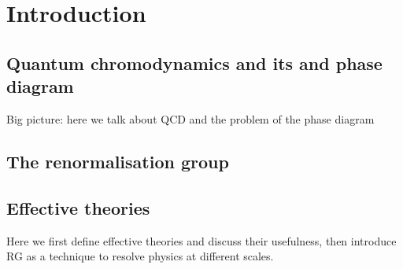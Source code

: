 \chapter{Introduction}
\section{Quantum chromodynamics and its and phase diagram}
Big picture: here we talk about QCD and the problem of the phase diagram
\section{The renormalisation group}
\section{Effective theories}
Here we first define effective theories and discuss their usefulness, then introduce RG as a technique to resolve physics at different scales.